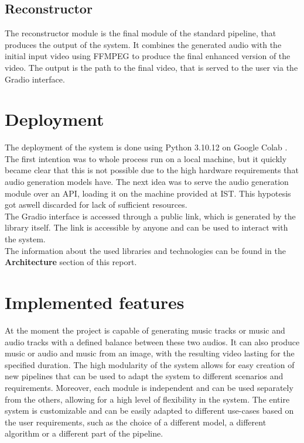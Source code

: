 \documentclass[conference]{IEEEtran}
\begin{document}
\subsection{Reconstructor}
The reconstructor module is the final module of the standard pipeline, that produces the output of the system.
It combines the generated audio with the initial input video using FFMPEG \cite{ffmpeg} to produce the final enhanced version of the video. 
The output is the path to the final video, that is served to the user via the Gradio interface.

\section{Deployment}
The deployment of the system is done using Python 3.10.12 on Google Colab \cite{Colab}. The first intention was to whole process run on a local machine, but it quickly became clear that this is not possible due to the high hardware requirements that audio generation models have.
The next idea was to serve the audio generation module over an API, loading it on the machine provided at IST. This hypotesis got aswell discarded for lack of sufficient resources.
\\The Gradio interface is accessed through a public link, which is generated by the library itself. The link is accessible by anyone and can be used to interact with the system.
\\The information about the used libraries and technologies can be found in the \textbf{Architecture} section of this report.

\section{Implemented features}
At the moment the project is capable of generating music tracks or music and audio tracks with a defined balance between these two audios. It can also produce music or audio and music from an image, with the resulting video lasting for the specified duration. 
The high modularity of the system allows for easy creation of new pipelines that can be used to adapt the system to different scenarios and requirements. Moreover, each 
module is independent and can be used separately from the others, allowing for a high level of flexibility in the system.  
The entire system is customizable and can be easily adapted to different use-cases based on the user requirements, such as the choice of a different model, a different algorithm or a different part of the pipeline.
\end{document}
